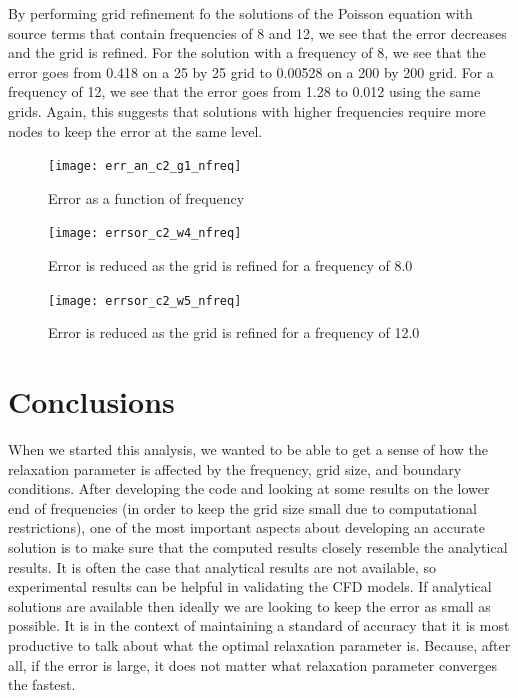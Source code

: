 \documentclass{article}
\begin{document}
\vspace{1em}

\noindent By performing grid refinement fo the solutions of the Poisson equation with source terms that contain frequencies of 8 and 12, we see that the error decreases and the grid is refined. For the solution with a frequency of 8, we see that the error goes from 0.418 on a 25 by 25 grid to 0.00528 on a 200 by 200 grid. For a frequency of 12, we see that the error goes from 1.28 to 0.012 using the same grids. Again, this suggests that solutions with higher frequencies require more nodes to keep the error at the same level.

\begin{figure}[H]
\centering
\texttt{[image: err\_an\_c2\_g1\_nfreq]}\label{Algebraic Convergence}
\caption{Error as a function of frequency }
\end{figure}

\begin{figure}[H]
\centering
\texttt{[image: errsor\_c2\_w4\_nfreq]}\label{Algebraic Convergence}
\caption{Error is reduced as the grid is refined for a frequency of 8.0}
\end{figure}

\begin{figure}[H]
\centering
\texttt{[image: errsor\_c2\_w5\_nfreq]}\label{Algebraic Convergence}
\caption{Error is reduced as the grid is refined for a frequency of 12.0}
\end{figure}

\vspace{1em}

\section{Conclusions}

\noindent When we started this analysis, we wanted to be able to get a sense of how the relaxation parameter is affected by the frequency, grid size, and boundary conditions. After developing the code and looking at some results on the lower end of frequencies (in order to keep the grid size small due to computational restrictions), one of the most important aspects about developing an accurate solution is to make sure that the computed results closely resemble the analytical results. It is often the case that analytical results are not available, so experimental results can be helpful in validating the CFD models. If analytical solutions are available then ideally we are looking to keep the error as small as possible. It is in the context of maintaining a standard of accuracy that it is most productive to talk about what the optimal relaxation parameter is. Because, after all, if the error is large, it does not matter what relaxation parameter converges the fastest. 
\end{document}
